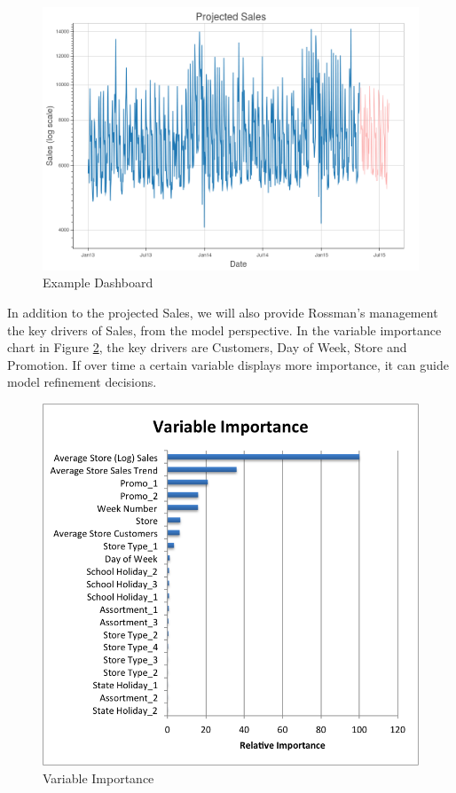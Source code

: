 \documentclass[DIV=calc, paper=a4, fontsize=11pt]{scrartcl}	 %
\begin{document}
\begin{figure}[!htbp]
\centering
\caption{Example Dashboard}
\label{dash}
\includegraphics[scale=0.35]{figures/dash.png}
\end{figure} 


In addition to the projected Sales, we will also provide Rossman’s management the key drivers of Sales, from the model perspective. In the variable importance chart in Figure \ref{variables}, the key drivers are Customers, Day of Week, Store and Promotion. If over time a certain variable displays more importance, it can guide model refinement decisions.



\begin{figure}[!htbp]
\centering
\caption{Variable Importance}
\label{variables}
\includegraphics[scale=0.5]{figures/VariableImportance.png}
\end{figure} 
\end{document}
